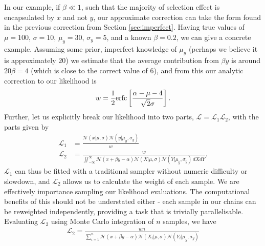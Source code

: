 \documentclass[a4paper,fleqn,usenatbib]{mnras}
\begin{document}
In our example, if $\beta \ll 1$, such that the majority of selection effect is encapsulated by $x$ and not $y$, our approximate correction can take the form found in the previous correction from Section \ref{sec:imperfect}. Having true values of $\mu = 100$, $\sigma = 10$, $\mu_y = 30$, $\sigma_y = 5$, and a known $\beta = 0.2$, we can give a concrete example. Assuming some prior, imperfect knowledge of $\mu_y$ (perhaps we believe it is approximately $20$) we estimate that the average contribution from $\beta y$ is around $20\beta = 4$ (which is close to the correct value of $6$), and from this our analytic correction to our likelihood is
\begin{align}
w = \frac{1}{2} {\rm erfc}\left[ \frac{\alpha - \mu - 4}{\sqrt{2}\sigma} \right].
\end{align}
Further, let us explicitly break our likelihood into two parts, $\mathcal{L} = \mathcal{L}_1 \mathcal{L}_2$, with the parts given by
\begin{align}
\mathcal{L}_1 &= \frac{ \mathcal{N}(x|\mu, \sigma) \mathcal{N}(y|\mu_y, \sigma_y)}{w} \\
\mathcal{L}_2 &= \frac{ w }{\iint_{-\infty}^\infty \mathcal{H}(x + \beta y - \alpha) \mathcal{N}(X|\mu, \sigma) \mathcal{N}(Y|\mu_y, \sigma_y)\, dX dY}.
\end{align}
$\mathcal{L}_1$ can thus be fitted with a traditional sampler without numeric difficulty or slowdown, and $\mathcal{L}_2$ allows us to calculate the weight of each sample. We are effectively importance sampling our likelihood evaluations. The computational benefits of this should not be understated either - each sample in our chains can be reweighted independently, providing a task that is trivially parallelisable. Evaluating $\mathcal{L}_2$ using Monte Carlo integration of $n$ samples, we have
\begin{align}
\mathcal{L}_2 = \frac{ w n }{\sum_{i=1}^{n} \mathcal{H}(x + \beta y - \alpha) \mathcal{N}(X_i|\mu, \sigma) \mathcal{N}(Y_i|\mu_y, \sigma_y)}
\end{align}
\end{document}
